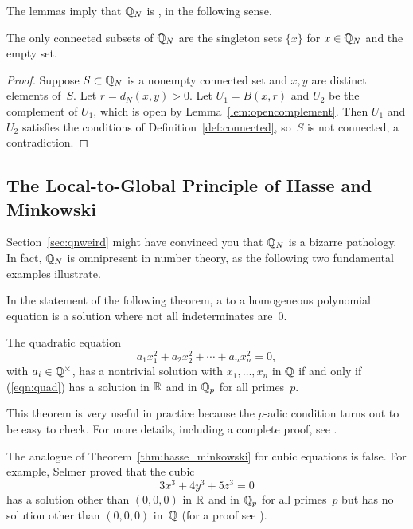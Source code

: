 The lemmas imply that $\mathbb{Q}_N$ is , 
in the following sense.
\begin{proposition}\label{prop:disconnected}
The only connected subsets of $\mathbb{Q}_N$ are the singleton sets
$\{x\}$ for $x\in\mathbb{Q}_N$ and the empty set.
\end{proposition}
\begin{proof}
Suppose $S\subset \mathbb{Q}_N$ is a nonempty connected set and $x, y$ are distinct
elements of~$S$.  Let $r=d_N(x,y)>0$.  Let $U_1=B(x,r)$ and $U_2$ be
the complement of $U_1$, which is open by Lemma~\ref{lem:opencomplement}.
Then $U_1$ and $U_2$ satisfies the conditions of Definition~\ref{def:connected},
so~$S$ is not connected, a contradiction.
\end{proof}


\subsection{The Local-to-Global Principle of Hasse and Minkowski}\label{sec:hasse}
Section~\ref{sec:qnweird} might have convinced you that $\mathbb{Q}_N$ is a
bizarre pathology.  In fact, $\mathbb{Q}_N$ is omnipresent in number theory,
as the following two fundamental examples illustrate.

In the statement of the following theorem, a 
to a homogeneous polynomial equation is a solution where not all
indeterminates are~$0$.
\begin{theorem}
\label{thm:hasse_minkowski}
The quadratic equation 
\begin{equation}\label{eqn:quad}
a_1x_1^2 + a_2 x_2^2 + \cdots + a_n x_n^2 = 0,
\end{equation}
with $a_i\in\mathbb{Q}^{\times}$,
has a nontrivial solution with $x_1,\ldots, x_n$ in $\mathbb{Q}$ if and only 
if  (\ref{eqn:quad}) has a solution in $\mathbb{R}$ and in $\mathbb{Q}_p$ for
all primes~$p$.
\end{theorem}
This theorem is very useful in practice because the 
$p$-adic condition turns out to be easy to check.  For more details,
including a complete proof, see 
\cite[IV.3.2]{serre:arithmetic}.

The analogue of Theorem~\ref{thm:hasse_minkowski}
for cubic equations is false.
For example, Selmer proved that the cubic 
$$
 3x^3 + 4y^3 + 5z^3 = 0
$$
has a solution other than $(0,0,0)$ in $\mathbb{R}$ and in $\mathbb{Q}_p$ for all primes~$p$
but has no solution other than $(0,0,0)$ in~$\mathbb{Q}$ (for a proof 
see \cite[\S 18]{cassels:lectures}).

